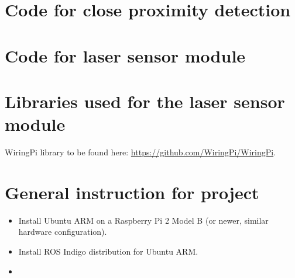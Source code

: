 \section{Code for close proximity detection}\label{code:proximity-full}


\clearpage

\section{Code for laser sensor module}\label{code:laser-full}


\clearpage

\section{Libraries used for the laser sensor module}\label{code:laser-libs}

\clearpage


WiringPi library to be found here: \url{https://github.com/WiringPi/WiringPi}.

\clearpage

\section{General instruction for project}
\begin{itemize}
	\item Install Ubuntu ARM on a Raspberry Pi 2 Model B (or newer, similar hardware configuration).
	\item Install ROS Indigo distribution for Ubuntu ARM.
	\item
\end{itemize}


